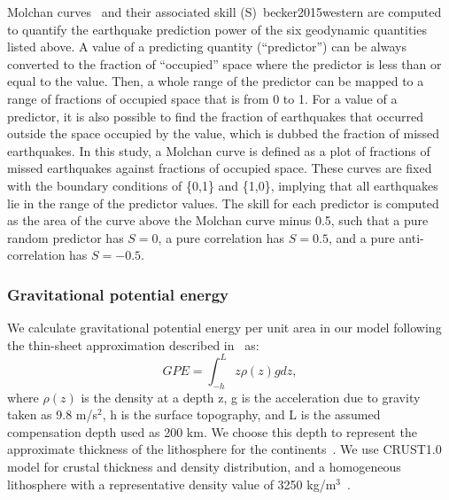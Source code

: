 \documentclass[draft,linenumbers]{agujournal2018}
\begin{document}
Molchan curves~\citep{molchan1990strategies, molchan1991structure} and their associated skill (S)~{becker2015western} are computed to quantify the earthquake prediction power of the six geodynamic quantities listed above. A value of a predicting quantity (``predictor'') can be always converted to the fraction of ``occupied'' space where the predictor is less than or equal to the value. Then, a whole range of the predictor can be mapped to a range of fractions of occupied space that is from 0 to 1. For a value of a predictor, it is also possible to find the fraction of earthquakes that occurred outside the space occupied by the value, which is dubbed the fraction of missed earthquakes. In this study, a Molchan curve is defined as a plot of fractions of missed earthquakes against fractions of occupied space. 
These curves are fixed with the boundary conditions of \{0,1\} and \{1,0\}, implying that all earthquakes lie in the range of the predictor values. The skill for each predictor is computed as the area of the curve above the Molchan curve minus 0.5, such that a pure random predictor has $S=0$, a pure correlation has $S=0.5$, and a pure anti-correlation has $S=-0.5$. 

\subsubsection{Gravitational potential energy}
We calculate gravitational potential energy per unit area in our model following the thin-sheet approximation described in~\citet{ghosh2009contribution} as:
\begin{equation}
GPE = \int_{-h}^{L} z \rho(z) g dz,
\end{equation}
where $\rho(z)$ is the density at a depth z, g is the acceleration due to gravity taken as 9.8 m/s$^2$, h is the surface topography, and L is the assumed compensation depth used as 200 km. We choose this depth to represent the approximate thickness of the lithosphere for the continents~\citep{mckenzie2005thermal}. We use CRUST1.0~\citep{laske2013update} model for crustal thickness and density distribution, and a homogeneous lithosphere with a representative density value of 3250 kg/m$^3$~\citep{becker2014static}. 
\end{document}
